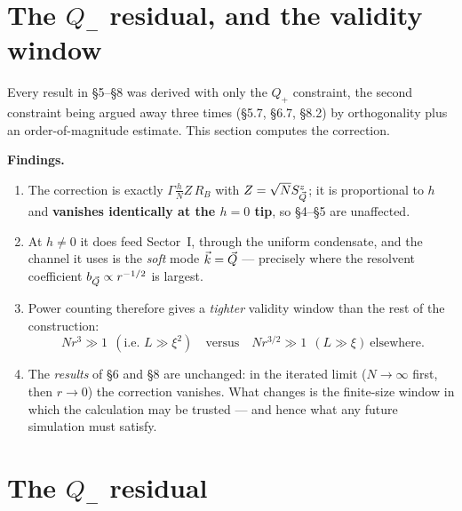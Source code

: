 \section{The $Q_-$ residual, and the validity window}

\noindent
Every result in \S5--\S8 was derived with only the $Q_+$ constraint, the second constraint
being argued away three times (\S5.7, \S6.7, \S8.2) by orthogonality plus an
order-of-magnitude estimate. This section computes the correction.

\medskip
\noindent
\textbf{Findings.}
\begin{enumerate}
  \item[(a)] The correction is exactly $\Gamma\frac{h}{N}Z\,R_B$ with
        $Z=\sqrt N S^z_{\vec Q}$; it is proportional to $h$ and \textbf{vanishes identically
        at the $h=0$ tip}, so \S4--\S5 are unaffected.
  \item[(b)] At $h\neq0$ it does feed Sector~I, through the uniform condensate, and the
        channel it uses is the \emph{soft} mode $\vec k=\vec Q$ --- precisely where the resolvent
        coefficient $b_{\vec Q}\propto r^{-1/2}$ is largest.
  \item[(c)] Power counting therefore gives a \emph{tighter} validity window than the rest
        of the construction:
        \begin{equation*}
          \boxed{\ N r^{3}\gg1\ \ (\text{i.e. } L\gg\xi^{2})\quad\text{versus}\quad
          Nr^{3/2}\gg1\ \ (L\gg\xi)\ \text{elsewhere.}}
        \end{equation*}
  \item[(d)] The \emph{results} of \S6 and \S8 are unchanged: in the iterated limit
        ($N\to\infty$ first, then $r\to0$) the correction vanishes. What changes is the
        finite-size window in which the calculation may be trusted --- and hence what any
        future simulation must satisfy.
\end{enumerate}

\section{The $Q_-$ residual}

